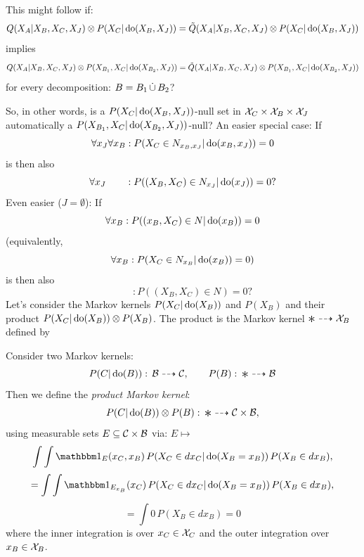 {\begin{enumerate}
    This might follow if:
    $$ Q(X_A|X_B,X_C,X_J) \otimes P(X_C|\operatorname{do}(X_B,X_J)) = \tilde Q(X_A|X_B,X_C,X_J) \otimes P(X_C|\operatorname{do}(X_B,X_J))$$
    implies
    $$ Q(X_A|X_B,X_C,X_J) \otimes P(X_{B_1},X_C|\operatorname{do}(X_{B_2},X_J)) = \tilde Q(X_A|X_B,X_C,X_J) \otimes P(X_{B_1},X_C|\operatorname{do}(X_{B_2},X_J))$$
    for every decomposition: $B=B_1 \,\dot{\cup}\, B_2$?

    So, in other words, is a $P(X_C|\operatorname{do}(X_B,X_J))$-null set in $\mathcal{X}_C \times \mathcal{X}_B \times \mathcal{X}_J$ automatically a $P(X_{B_1},X_C|\operatorname{do}(X_{B_2},X_J))$-null?
    An easier special case:
    If 
    $$\forall x_J \forall x_B: P(X_C \in N_{x_B,x_J}|\operatorname{do}(x_B,x_J)) = 0$$
    is then also
    $$\forall x_J \qquad: P((X_B,X_C) \in N_{x_J}|\operatorname{do}(x_J)) = 0?$$
    Even easier ($J=\emptyset$): If
    $$\forall x_B: P((x_B,X_C) \in N|\operatorname{do}(x_B)) = 0$$
    (equivalently,
    $$\forall x_B: P(X_C \in N_{x_B}|\operatorname{do}(x_B)) = 0)$$
    is then also
    $$\qquad: P((X_B,X_C) \in N) = 0?$$
   Let's consider the Markov kernels $P(X_C|\operatorname{do}(X_B))$ and $P(X_B)$ and their product $P(X_C|\operatorname{do}(X_B)) \otimes P(X_B)$.
   The product is the Markov kernel $\Asterisk \dshto \CX_B$ defined by

   Consider two Markov kernels:
   \[ P(C|\doit(B)):\, \Bcal \dshto \Ccal,\qquad  
   P(B):\, \Asterisk \dshto \Bcal \]
   Then we define the \emph{product Markov kernel}:
   \[ P(C|\doit(B)) \otimes P(B) :\, \Asterisk \dshto \Ccal \times \Bcal, \]
   using  measurable sets $E \subseteq \mathcal{C} \times \mathcal{B}$ via: $E \mapsto $
   \[\int\int \I_E(x_C,x_B)\, P(X_C \in dx_C|\doit(X_B=x_B)) \, P(X_B \in dx_B),\]
   \[=\int\int \I_{E_{x_B}}(x_C)\, P(X_C \in dx_C|\doit(X_B=x_B)) \, P(X_B \in dx_B),\]
   \[=\int 0 \, P(X_B \in dx_B) = 0\]
  where the inner integration is over $x_C \in \mathcal{X}_C$ and the outer integration over $x_B \in \mathcal{X}_B$.
  

\end{enumerate}}
